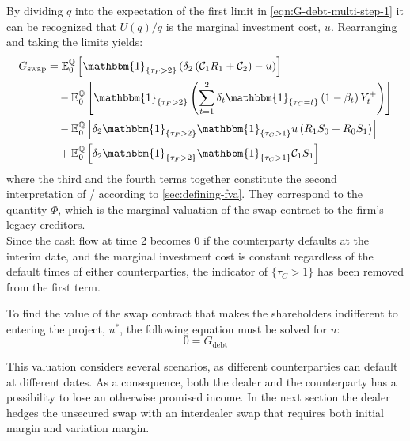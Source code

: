 \documentclass[main.tex]{subfiles}
\begin{document}
        By dividing $q$ into the expectation of the first limit in \cref{eqn:G-debt-multi-step-1}
        it can be recognized that $U(q)/q$ is the marginal investment cost, $u$.
        Rearranging and taking the limits yields:
        \begin{align}
            G_{\text{swap}} &= 
            \mathbb{E}_{0}^{\rnmeasure}\left[
                \mathbbm{1}_{\{\tau_{F}>2\}}
                \left(
                    \delta_{2} \left(\mathcal{C}_{1} R_{1} + \mathcal{C}_{2}\right) - u
                \right)
            \right]
            \nonumber
            \\
            &\quad-
            \mathbb{E}_{0}^{\rnmeasure}\left[
                \mathbbm{1}_{\{\tau_{F}>2\}}
                \left(
                    \sum_{t=1}^{2} \delta_{t} \mathbbm{1}_{\{\tau_{C}=t\}}\left(1-\beta_t\right)Y_{t}^{+}
                \right)
            \right]
            \nonumber
            \\
            &\quad-
            \mathbb{E}_{0}^{\rnmeasure}\left[
                \delta_2 \mathbbm{1}_{\{\tau_{F}>2\}} \mathbbm{1}_{\{\tau_{C}>1\}} u \left(
                    R_{1} S_{0} + R_{0} S_{1}
                \right)
            \right]
            \nonumber
            \\
            &\quad+
            \mathbb{E}_{0}^{\rnmeasure}\left[
                \delta_2 \mathbbm{1}_{\{\tau_{F}>2\}} \mathbbm{1}_{\{\tau_{C}>1\}}
                \mathcal{C}_{1} S_1
            \right]
            \label{eqn:shareholders-value-multi-period-swap}
        \end{align}
        where the third and the fourth terms together constitute the second interpretation of \FVA/ according to \cref{sec:defining-fva}.
        They correspond to the quantity $\Phi$, which is the marginal valuation of the swap contract to the firm's legacy creditors.
        \\
        Since the cash flow at time 2 becomes 0 if the counterparty defaults at the interim date,
        and the marginal investment cost is constant regardless of the default times of either counterparties,
        the indicator of $\{\tau_{C}>1\}$ has been removed from the first term.

        To find the value of the swap contract that makes the shareholders indifferent to entering the project, $u^{\ast}$,
        the following equation must be solved for $u$:
        \begin{equation}
            0 = G_{\text{debt}}
        \end{equation}

        This valuation considers several scenarios, as different counterparties can default at different dates.
        As a consequence, both the dealer and the counterparty has a possibility to lose an otherwise promised income.
        In the next section the dealer hedges the unsecured swap with an interdealer swap that requires both initial margin and variation margin.
\end{document}
